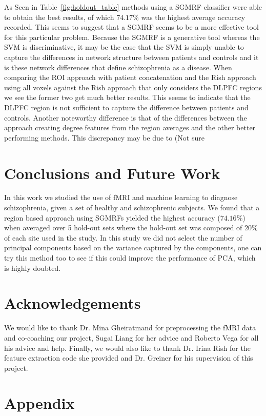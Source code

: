 \documentclass{article} %
\begin{document}
As Seen in Table~\ref{fig:holdout_table} methods using a SGMRF classifier were
able to obtain the best results, of which $74.17\%$ was the highest average
accuracy recorded. This seems to suggest that a SGMRF seems to be a more
effective tool for this particular problem. Because the SGMRF is a generative
tool whereas the SVM is discriminative, it may be the case that the SVM is
simply unable to capture the differences in network structure between patients
and controls and it is these network differences that define schizophrenia as
a disease. When comparing the ROI approach with patient concatenation and the
Rish approach using all voxels against the Rish approach that only considers
the DLPFC regions we see the former two get much better results. This seems
to indicate that the DLPFC region is not sufficient to capture the difference
between patients and controls. Another noteworthy difference is that of the
differences between the approach creating degree features from the region
averages and the other better performing methods. This discrepancy may be due
to (Not sure %


\section{Conclusions and Future Work}
In this work we studied the use of fMRI and machine learning to diagnose
schizophrenia, given a set of healthy and schizophrenic subjects. We found
that a region based approach using SGMRFs yielded the highest accuracy 
($74.16\%$) when averaged over 5 hold-out sets where the hold-out set was
composed of $20\%$ of each site used in the study. In this study we did not select the number of principal components based on the variance captured by the components, one can try this method too to see if this could improve the performance of PCA, which is highly doubted. 

\section{Acknowledgements}
We would like to thank Dr. Mina Gheiratmand for preprocessing the fMRI data 
and co-coaching our project, Sugai Liang for her advice and Roberto Vega for
all his advice and help. Finally, we would also like to thank Dr. Irina Rish
for the feature extraction code she provided and Dr. Greiner for his
supervision of this project.




\section{Appendix}
\end{document}
